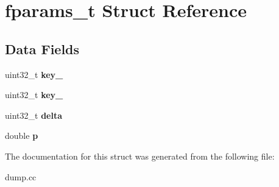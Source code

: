 \hypertarget{structfparams__t}{\section{fparams\-\_\-t \-Struct \-Reference}
\label{structfparams__t}
}
\subsection*{\-Data \-Fields}
\begin{DoxyCompactItemize}
\item 
\hypertarget{structfparams__t_a4a40caf068d1d263f1edd7d8e869652c}{uint32\-\_\-t {\bfseries key\-\_}}\label{structfparams__t_a4a40caf068d1d263f1edd7d8e869652c}

\item 
\hypertarget{structfparams__t_a86974ed376c93ea482f0c602d22ce3eb}{uint32\-\_\-t {\bfseries key\-\_}}\label{structfparams__t_a86974ed376c93ea482f0c602d22ce3eb}

\item 
\hypertarget{structfparams__t_a9bb753daaba9d9ba3a45f2265499ba7d}{uint32\-\_\-t {\bfseries delta}}\label{structfparams__t_a9bb753daaba9d9ba3a45f2265499ba7d}

\item 
\hypertarget{structfparams__t_aeb12db7d20690d332e78b8b0b1b4f243}{double {\bfseries p}}\label{structfparams__t_aeb12db7d20690d332e78b8b0b1b4f243}

\end{DoxyCompactItemize}


\-The documentation for this struct was generated from the following file\-:\begin{DoxyCompactItemize}
\item 
dump.\-cc\end{DoxyCompactItemize}

